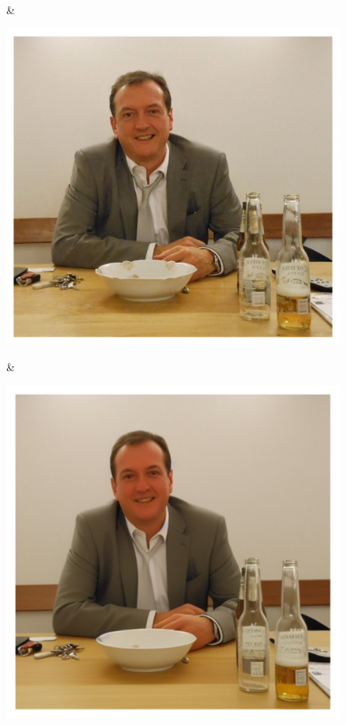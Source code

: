 \documentclass[letterpaper]{article} %
\begin{document}
\begin{figure}
\begin{tabular}
\begin{minipage}{\linewidth}
    \end{minipage} &
    \begin{minipage}{\linewidth}
        \includegraphics[width=\linewidth]{original_compare/26.pdf}
    \end{minipage} &
    \begin{minipage}{\linewidth}
        \includegraphics[width=\linewidth]{Ours_compare/26.pdf}

\end{minipage}
\end{tabular}
\end{figure}
\end{document}
